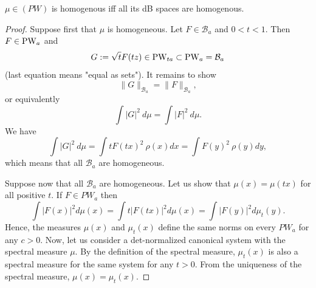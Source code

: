 \documentclass[10pt,a4paper]{amsart}
\def\BB{{\mathcal B}}
\def\PW{\text{\rm PW}}
\begin{document}
\begin{theorem}\label{thm2}  $\mu\in(PW)$ is homogenous iff all its dB spaces are homogenous. \end{theorem}

\begin{proof} 
	
Suppose first that $\mu$ is homogeneous.	Let $F\in \BB_a$ and $0<t<1$. Then
$F\in \PW_a$ and 
$$G:=\sqrt t F(tz)\in\PW_{ta}\subset \PW_a=\BB_a$$
(last equation means "equal as sets"). It remains to show
$$\|G\|_{\BB_a}=
\|F\|_{\BB_a},$$  or equivalently
$$\int |G|^2~d\mu=\int |F|^2~d\mu.$$
We have
$$\int |G|^2~d\mu=\int tF(tx)^2~\rho(x)dx=\int F(y)^2~\rho(y)dy,$$
which means that all $\BB_a$ are homogeneous.

Suppose now that all $\BB_a$ are homogeneous. Let us show that $\mu(x)=\mu(tx)$ for all positive $t$.
If $F\in PW_a$ then
$$\int |F(x)|^2d\mu(x)=\int t|F(tx)|^2d\mu(x)=\int |F(y)|^2d\mu_t(y).$$
Hence, the measures $\mu(x)$ and $\mu_t(x)$ define the same norms on every $PW_a$ for any $c>0$.
Now, let us consider a det-normalized canonical system with the spectral measure $\mu$. 
By the definition of the spectral measure, $\mu_t(x)$ is also a spectral measure for the same system for any $t>0$.
From the uniqueness of the spectral measure, $\mu(x)=\mu_t(x)$.


\end{proof}
\end{document}

